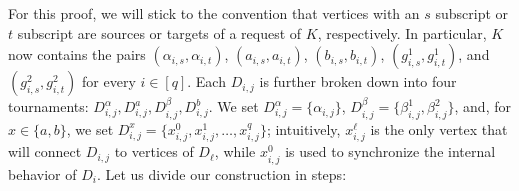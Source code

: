 \documentclass[a4paper,UKenglish,cleveref, autoref, thm-restate]{lipics-v2021}
\begin{document}
For this proof, we will stick to the convention that vertices with an $s$ subscript or
$t$ subscript are sources or targets of a request of $K$, respectively.
In particular, $K$ now contains the pairs $(\alpha_{i,s}, \alpha_{i,t})$, $(a_{i,s}, a_{i,t})$,
$(b_{i,s}, b_{i,t})$, $(g^1_{i, s}, g^1_{i, t})$, and $(g^2_{i, s}, g^2_{i, t})$ for
every $i \in [q]$.
Each $D_{i,j}$ is further broken down into four tournaments: $D_{i,j}^\alpha, D_{i,j}^a,
D_{i,j}^\beta, D_{i,j}^b$.
We set $D_{i,j}^\alpha = \{\alpha_{i,j}\}$, $D_{i,j}^\beta = \{\beta^1_{i,j},
\beta^2_{i,j}\}$, and, for $x \in \{a,b\}$, we set $D_{i,j}^x = \{x_{i,j}^0, x_{i,j}^1,
\dots, x_{i,j}^q\}$; intuitively, $x^\ell_{i,j}$ is the only vertex that will connect
$D_{i,j}$ to vertices of $D_\ell$, while $x^0_{i,j}$ is used to synchronize the internal
behavior of $D_i$.
Let us divide our construction in steps:
\end{document}
